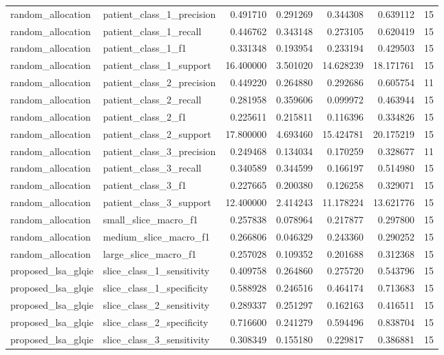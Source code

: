 \begin{tabular}{llrrrrr}
random_allocation & patient_class_1_precision & 0.491710 & 0.291269 & 0.344308 & 0.639112 & 15 \\
random_allocation & patient_class_1_recall & 0.446762 & 0.343148 & 0.273105 & 0.620419 & 15 \\
random_allocation & patient_class_1_f1 & 0.331348 & 0.193954 & 0.233194 & 0.429503 & 15 \\
random_allocation & patient_class_1_support & 16.400000 & 3.501020 & 14.628239 & 18.171761 & 15 \\
random_allocation & patient_class_2_precision & 0.449220 & 0.264880 & 0.292686 & 0.605754 & 11 \\
random_allocation & patient_class_2_recall & 0.281958 & 0.359606 & 0.099972 & 0.463944 & 15 \\
random_allocation & patient_class_2_f1 & 0.225611 & 0.215811 & 0.116396 & 0.334826 & 15 \\
random_allocation & patient_class_2_support & 17.800000 & 4.693460 & 15.424781 & 20.175219 & 15 \\
random_allocation & patient_class_3_precision & 0.249468 & 0.134034 & 0.170259 & 0.328677 & 11 \\
random_allocation & patient_class_3_recall & 0.340589 & 0.344599 & 0.166197 & 0.514980 & 15 \\
random_allocation & patient_class_3_f1 & 0.227665 & 0.200380 & 0.126258 & 0.329071 & 15 \\
random_allocation & patient_class_3_support & 12.400000 & 2.414243 & 11.178224 & 13.621776 & 15 \\
random_allocation & small_slice_macro_f1 & 0.257838 & 0.078964 & 0.217877 & 0.297800 & 15 \\
random_allocation & medium_slice_macro_f1 & 0.266806 & 0.046329 & 0.243360 & 0.290252 & 15 \\
random_allocation & large_slice_macro_f1 & 0.257028 & 0.109352 & 0.201688 & 0.312368 & 15 \\
proposed_lsa_glqie & slice_class_1_sensitivity & 0.409758 & 0.264860 & 0.275720 & 0.543796 & 15 \\
proposed_lsa_glqie & slice_class_1_specificity & 0.588928 & 0.246516 & 0.464174 & 0.713683 & 15 \\
proposed_lsa_glqie & slice_class_2_sensitivity & 0.289337 & 0.251297 & 0.162163 & 0.416511 & 15 \\
proposed_lsa_glqie & slice_class_2_specificity & 0.716600 & 0.241279 & 0.594496 & 0.838704 & 15 \\
proposed_lsa_glqie & slice_class_3_sensitivity & 0.308349 & 0.155180 & 0.229817 & 0.386881 & 15 \\

\end{tabular}
